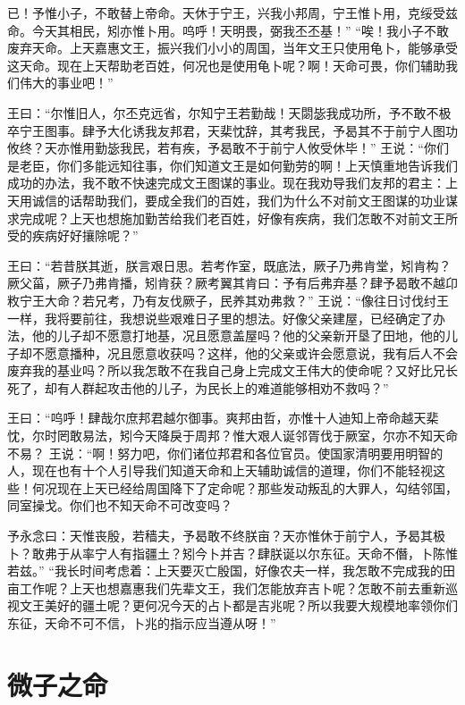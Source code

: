 \documentclass[a4paper,12pt,UTF8,twoside]{ctexbook}
\begin{document}
已！予惟小子，不敢替上帝命。天休于宁王，兴我小邦周，宁王惟卜用，克绥受兹命。今天其相民，矧亦惟卜用。呜呼！天明畏，弼我丕丕基！”
“唉！我小子不敢废弃天命。上天嘉惠文王，振兴我们小小的周国，当年文王只使用龟卜，能够承受这天命。现在上天帮助老百姓，何况也是使用龟卜呢？啊！天命可畏，你们辅助我们伟大的事业吧！”

王曰：“尔惟旧人，尔丕克远省，尔知宁王若勤哉！天閟毖我成功所，予不敢不极卒宁王图事。肆予大化诱我友邦君，天棐忱辞，其考我民，予曷其不于前宁人图功攸终？天亦惟用勤毖我民，若有疾，予曷敢不于前宁人攸受休毕！”
王说：“你们是老臣，你们多能远知往事，你们知道文王是如何勤劳的啊！上天慎重地告诉我们成功的办法，我不敢不快速完成文王图谋的事业。现在我劝导我们友邦的君主：上天用诚信的话帮助我们，要成全我们的百姓，我们为什么不对前文王图谋的功业谋求完成呢？上天也想施加勤苦给我们老百姓，好像有疾病，我们怎敢不对前文王所受的疾病好好攘除呢？”

王曰：“若昔朕其逝，朕言艰日思。若考作室，既底法，厥子乃弗肯堂，矧肯构？厥父菑，厥子乃弗肯播，矧肯获？厥考翼其肯曰：予有后弗弃基？肆予曷敢不越卬敉宁王大命？若兄考，乃有友伐厥子，民养其劝弗救？”
王说：“像往日讨伐纣王一样，我将要前往，我想说些艰难日子里的想法。好像父亲建屋，已经确定了办法，他的儿子却不愿意打地基，况且愿意盖屋吗？他的父亲新开垦了田地，他的儿子却不愿意播种，况且愿意收获吗？这样，他的父亲或许会愿意说，我有后人不会废弃我的基业吗？所以我怎敢不在我自己身上完成文王伟大的使命呢？又好比兄长死了，却有人群起攻击他的儿子，为民长上的难道能够相劝不救吗？”

王曰：“呜呼！肆哉尔庶邦君越尔御事。爽邦由哲，亦惟十人迪知上帝命越天棐忱，尔时罔敢易法，矧今天降戾于周邦？惟大艰人诞邻胥伐于厥室，尔亦不知天命不易？
王说：“啊！努力吧，你们诸位邦君和各位官员。使国家清明要用明智的人，现在也有十个人引导我们知道天命和上天辅助诚信的道理，你们不能轻视这些！何况现在上天已经给周国降下了定命呢？那些发动叛乱的大罪人，勾结邻国，同室操戈。你们也不知天命不可改变吗？

予永念曰：天惟丧殷，若穑夫，予曷敢不终朕亩？天亦惟休于前宁人，予曷其极卜？敢弗于从率宁人有指疆土？矧今卜并吉？肆朕诞以尔东征。天命不僭，卜陈惟若兹。”
“我长时间考虑着：上天要灭亡殷国，好像农夫一样，我怎敢不完成我的田亩工作呢？上天也想嘉惠我们先辈文王，我们怎能放弃吉卜呢？怎敢不前去重新巡视文王美好的疆土呢？更何况今天的占卜都是吉兆呢？所以我要大规模地率领你们东征，天命不可不信，卜兆的指示应当遵从呀！”

\chapter{微子之命}
\end{document}
